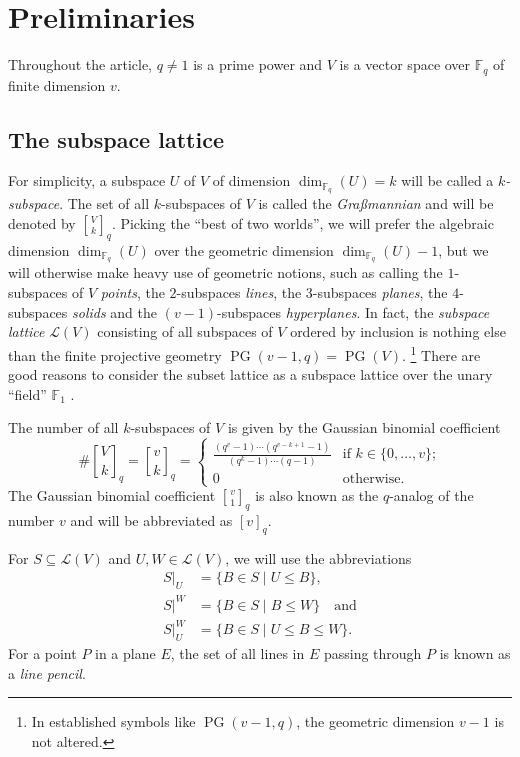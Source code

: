 \documentclass[a4paper,abstracton,12pt]{scrartcl}
\newcommand{\F}{\mathbb{F}}
\newcommand{\qbinom}[3]{\genfrac{[}{]}{0pt}{}{#1}{#2}_{#3}}
\newcommand{\qnumb}[2]{[#1]_{#2}}
\DeclareMathOperator{\PG}{PG}
\theoremstyle{definition}
\theoremstyle{remark}
\begin{document}
\section{Preliminaries}
Throughout the article, $q \neq 1$ is a prime power and $V$ is a vector space over $\F_q$ of finite dimension $v$.

\subsection{The subspace lattice}
For simplicity, a subspace $U$ of $V$ of dimension $\dim_{\F_q}(U) = k$ will be called a \emph{$k$-subspace}.
The set of all $k$-subspaces of $V$ is called the \emph{Graßmannian} and will be denoted by $\qbinom{V}{k}{q}$.
Picking the \enquote{best of two worlds}, we will prefer the algebraic dimension $\dim_{\F_q}(U)$ over the geometric dimension $\dim_{\F_q}(U) - 1$, but we will otherwise make heavy use of geometric notions, such as calling the $1$-subspaces of $V$ \emph{points}, the $2$-subspaces \emph{lines}, the $3$-subspaces \emph{planes}, the $4$-subspaces \emph{solids} and the $(v-1)$-subspaces \emph{hyperplanes}.
In fact, the \emph{subspace lattice} $\mathcal{L}(V)$ consisting of all subspaces of $V$ ordered by inclusion is nothing else than the finite projective geometry $\PG(v-1,q) = \PG(V)$.%
\footnote{In established symbols like $\PG(v-1,q)$, the geometric dimension $v-1$ is not altered.}
There are good reasons to consider the subset lattice as a subspace lattice over the unary \enquote{field} $\F_1$ \cite{Cohn-2004-AMM111[6]:487-495}.

The number of all $k$-subspaces of $V$ is given by the Gaussian binomial coefficient
\[
\#\qbinom{V}{k}{q}
= \qbinom{v}{k}{q}
= \begin{cases}
	\frac{(q^v-1)\cdots(q^{v-k+1}-1)}{(q^k-1)\cdots(q-1)} & \text{if } k\in\{0,\ldots,v\}\text{;}\\
	0 & \text{otherwise.}
\end{cases}
\]
The Gaussian binomial coefficient $\qbinom{v}{1}{q}$ is also known as the $q$-analog of the number $v$ and will be abbreviated as $\qnumb{v}{q}$.

For $S \subseteq \mathcal{L}(V)$ and $U,W\in\mathcal{L}(V)$, we will use the abbreviations
\begin{align*}
S|_U & = \{B\in S \mid U \leq B\}\text{,} \\
S|^W & = \{B\in S\mid B\leq W\}\quad\text{and} \\
S|_U^W & = \{B\in S\mid U \leq B\leq W\}\text{.}
\end{align*}
For a point $P$ in a plane $E$, the set of all lines in $E$ passing through $P$ is known as a \emph{line pencil}.
\end{document}
